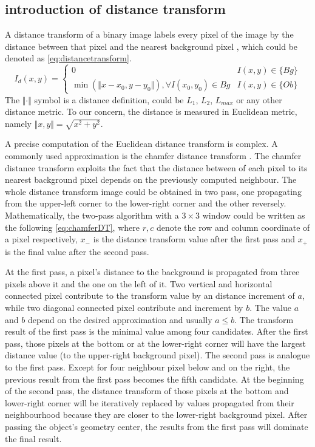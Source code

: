 \subsection{introduction of distance transform}
A distance transform of a binary image labels every pixel of the image by the distance between that pixel and the nearest background pixel \cite{bailey2004efficient}, which could be denoted as \autoref{eq:distancetransform}.
\begin{equation}\label{eq:distancetransform}
  I_d(x,y) = \left\{\begin{array}{cc}
               0 & I(x,y)\in\{Bg\} \\
               \min\left(\Vert x-x_0,y-y_0\Vert\right),\forall I(x_0,y_0)\in Bg & I(x,y)\in\{Ob\}
             \end{array}\right.
\end{equation}
The $\Vert\cdot\Vert$ symbol is a distance definition, could be $L_1$, $L_2$, $L_{max}$ or any other distance metric. To our concern, the distance is measured in Euclidean metric, namely $\Vert x,y\Vert=\sqrt{x^2+y^2}$.

A precise computation of the Euclidean distance transform is complex. A commonly used approximation is the chamfer distance transform \cite{butt1998optimum}. The chamfer distance transform exploits the fact that the distance between of each pixel to its nearest background pixel depends on the previously computed neighbour. The whole distance transform image could be obtained in two pass, one propagating from the upper-left corner to the lower-right corner and the other reversely. Mathematically, the two-pass algorithm with a $3\times3$ window could be written as the following \autoref{eq:chamferDT}, where $r,c$ denote the row and column coordinate of a pixel respectively, $x_-$ is the distance transform value after the first pass and $x_+$ is the final value after the second pass.

At the first pass, a pixel's distance to the background is propagated from three pixels above it and the one on the left of it. Two vertical and horizontal connected pixel contribute to the transform value by an distance increment of $a$, while two diagonal connected pixel contribute and increment by $b$. The value $a$ and $b$ depend on the desired approximation and usually $a\le b$. The transform result of the first pass is the minimal value among four candidates. After the first pass, those pixels at the bottom or at the lower-right corner will have the largest distance value (to the upper-right background pixel). The second pass is analogue to the first pass. Except for four neighbour pixel below and on the right, the previous result from the first pass becomes the fifth candidate. At the beginning of the second pass, the distance transform of those pixels at the bottom and lower-right corner will be iteratively replaced by values propagated from their neighbourhood because they are closer to the lower-right background pixel. After passing the object's geometry center, the results from the first pass will dominate the final result.

